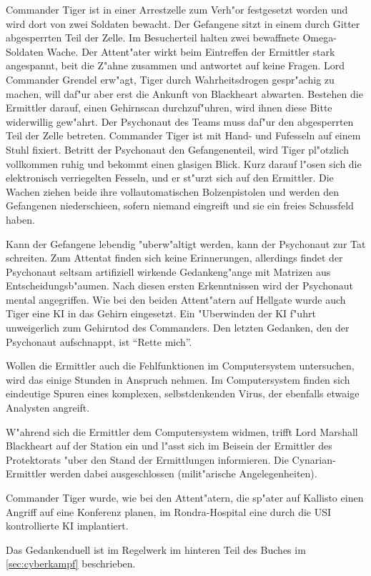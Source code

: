 Commander Tiger ist in einer Arrestzelle zum Verh"or festgesetzt worden und wird dort von zwei Soldaten bewacht. Der Gefangene sitzt in einem durch Gitter abgesperrten Teil der Zelle. Im Besucherteil halten zwei bewaffnete Omega-Soldaten Wache. Der Attent"ater wirkt beim Eintreffen der Ermittler stark angespannt, bei\3t die Z"ahne zusammen und antwortet auf keine Fragen. Lord Commander Grendel erw"agt, Tiger durch Wahrheitsdrogen gespr"achig zu machen, will daf"ur aber erst die Ankunft von Blackheart abwarten. Bestehen die Ermittler darauf, einen Gehirnscan durchzuf"uhren, wird ihnen diese Bitte widerwillig gew"ahrt. Der Psychonaut des Teams muss daf"ur den abgesperrten Teil der Zelle betreten. Commander Tiger ist mit Hand- und Fu\3fesseln auf einem Stuhl fixiert. Betritt der Psychonaut den Gefangenenteil, wird Tiger pl"otzlich vollkommen ruhig und bekommt einen glasigen Blick. Kurz darauf l"osen sich die elektronisch verriegelten Fesseln, und er st"urzt sich auf den Ermittler. Die Wachen ziehen beide ihre vollautomatischen Bolzenpistolen und werden den Gefangenen niederschie\3en, sofern niemand eingreift und sie ein freies Schussfeld haben.

Kann der Gefangene lebendig "uberw"altigt werden, kann der Psychonaut zur Tat schreiten. Zum Attentat finden sich keine Erinnerungen, allerdings findet der Psychonaut seltsam artifiziell wirkende Gedankeng"ange mit Matrizen aus Entscheidungsb"aumen. Nach diesen ersten Erkenntnissen wird der Psychonaut mental angegriffen. Wie bei den beiden Attent"atern auf Hellgate wurde auch Tiger eine KI in das Gehirn eingesetzt. Ein "Uberwinden der KI f"uhrt unweigerlich zum Gehirntod des Commanders. Den letzten Gedanken, den der Psychonaut aufschnappt, ist "`Rette mich"'.

Wollen die Ermittler auch die Fehlfunktionen im Computersystem untersuchen, wird das einige Stunden in Anspruch nehmen. Im Computersystem finden sich eindeutige Spuren eines komplexen, selbstdenkenden Virus, der ebenfalls etwaige Analysten angreift.

W"ahrend sich die Ermittler dem Computersystem widmen, trifft Lord Marshall Blackheart auf der Station ein und l"asst sich im Beisein der Ermittler des Protektorats "uber den Stand der Ermittlungen informieren. Die Cynarian-Ermittler werden dabei ausgeschlossen (milit"arische Angelegenheiten).

\begin{remarks}
	Commander Tiger wurde, wie bei den Attent"atern, die sp"ater auf Kallisto einen Angriff auf eine Konferenz planen, im Rondra-Hospital eine durch die USI kontrollierte KI implantiert.

	Das Gedankenduell ist im Regelwerk im hinteren Teil des Buches im \cref{sec:cyberkampf} beschrieben.
\end{remarks}
